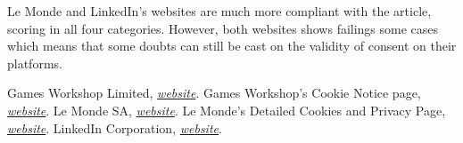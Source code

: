 \documentclass[twocolumn, letterpaper]{scrartcl}
\begin{document}
	Le Monde and LinkedIn's websites are much more compliant with the article, scoring in all four categories. However, both websites shows failings some cases which means that some doubts can still be cast on the validity of consent on their platforms.
	
       
    \begin{thebibliography}{9}

    	Games Workshop Limited, \textit{\href{https://www.games-workshop.com/en-US/Home}{website}}.
    	Games Workshop's Cookie Notice page, \textit{\href{https://www.games-workshop.com/en-EU/Cookie-Notice}{website}}.
    	Le Monde SA, \textit{\href{https://www.lemonde.fr/}{website}}.
    	Le Monde's Detailed Cookies and Privacy Page, \textit{\href{https://www.lemonde.fr/confidentialite/}{website}}.
    	LinkedIn Corporation, \textit{\href{https://www.linkedin.com/}{website}}.

    \end{thebibliography}
\end{document}
